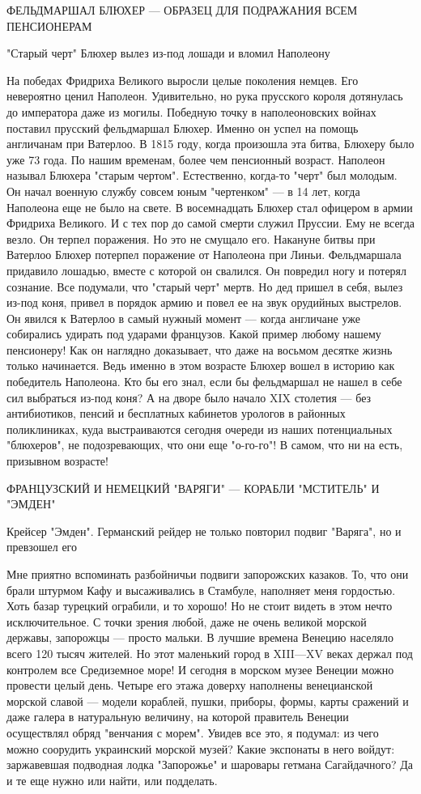 ФЕЛЬДМАРШАЛ БЛЮХЕР --- ОБРАЗЕЦ ДЛЯ ПОДРАЖАНИЯ ВСЕМ ПЕНСИОНЕРАМ 

"Старый черт" Блюхер вылез из-под лошади и вломил Наполеону

На победах Фридриха Великого выросли целые поколения немцев. Его невероятно
ценил Наполеон. Удивительно, но рука прусского короля дотянулась до императора
даже из могилы. Победную точку в наполеоновских войнах поставил прусский
фельдмаршал Блюхер. Именно он успел на помощь англичанам при Ватерлоо. В 1815
году, когда произошла эта битва, Блюхеру было уже 73 года. По нашим временам,
более чем пенсионный возраст. Наполеон называл Блюхера "старым чертом".
Естественно, когда-то "черт" был молодым. Он начал военную службу совсем юным
"чертенком" --- в 14 лет, когда Наполеона еще не было на свете. В восемнадцать
Блюхер стал офицером в армии Фридриха Великого. И с тех пор до самой смерти
служил Пруссии. Ему не всегда везло. Он терпел поражения. Но это не смущало
его. Накануне битвы при Ватерлоо Блюхер потерпел поражение от Наполеона при
Линьи. Фельдмаршала придавило лошадью, вместе с которой он свалился. Он
повредил ногу и потерял сознание. Все подумали, что "старый черт" мертв. Но дед
пришел в себя, вылез из-под коня, привел в порядок армию и повел ее на звук
орудийных выстрелов. Он явился к Ватерлоо в самый нужный момент --- когда
англичане уже собирались удирать под ударами французов. Какой пример любому
нашему пенсионеру! Как он наглядно доказывает, что даже на восьмом десятке
жизнь только начинается. Ведь именно в этом возрасте Блюхер вошел в историю как
победитель Наполеона. Кто бы его знал, если бы фельдмаршал не нашел в себе сил
выбраться из-под коня? А на дворе было начало XIX столетия --- без антибиотиков,
пенсий и бесплатных кабинетов урологов в районных поликлиниках, куда
выстраиваются сегодня очереди из наших потенциальных "блюхеров", не
подозревающих, что они еще "о-го-го"! В самом, что ни на есть, призывном
возрасте!

ФРАНЦУЗСКИЙ И НЕМЕЦКИЙ "ВАРЯГИ" --- КОРАБЛИ "МСТИТЕЛЬ" И "ЭМДЕН" 

Крейсер "Эмден". Германский рейдер не только повторил подвиг "Варяга", но и
превзошел его

Мне приятно вспоминать разбойничьи подвиги запорожских казаков. То, что они
брали штурмом Кафу и высаживались в Стамбуле, наполняет меня гордостью. Хоть
базар турецкий ограбили, и то хорошо! Но не стоит видеть в этом нечто
исключительное. С точки зрения любой, даже не очень великой морской державы,
запорожцы --- просто мальки. В лучшие времена Венецию населяло всего 120 тысяч
жителей. Но этот маленький город в XIII—XV веках держал под контролем все
Средиземное море! И сегодня в морском музее Венеции можно провести целый день.
Четыре его этажа доверху наполнены венецианской морской славой --- модели
кораблей, пушки, приборы, формы, карты сражений и даже галера в натуральную
величину, на которой правитель Венеции осуществлял обряд "венчания с морем".
Увидев все это, я подумал: из чего можно соорудить украинский морской музей?
Какие экспонаты в него войдут: заржавевшая подводная лодка "Запорожье" и
шаровары гетмана Сагайдачного? Да и те еще нужно или найти, или подделать.

